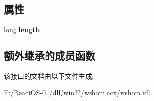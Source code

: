 \subsection*{属性}
\begin{DoxyCompactItemize}
\item 
\mbox{\label{interface_i_wsh_runtime_library_1_1_i_wsh_collection_ac59e4872ff9328a2edb971ca849df0d8}} 
long {\bfseries length}
\end{DoxyCompactItemize}
\subsection*{额外继承的成员函数}


该接口的文档由以下文件生成\+:\begin{DoxyCompactItemize}
\item 
E\+:/\+React\+O\+S-\/0../dll/win32/wshom.\+ocx/wshom.\+idl\end{DoxyCompactItemize}
